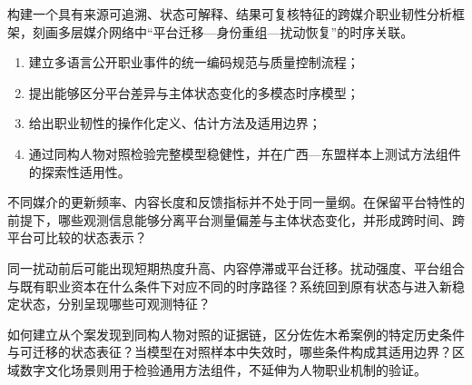 
构建一个具有来源可追溯、状态可解释、结果可复核特征的跨媒介职业韧性分析框架，刻画多层媒介网络中“平台迁移—身份重组—扰动恢复”的时序关联。

\begin{enumerate}[label=（\arabic*）,leftmargin=*,itemsep=0pt]
  \item 建立多语言公开职业事件的统一编码规范与质量控制流程；
  \item 提出能够区分平台差异与主体状态变化的多模态时序模型；
  \item 给出职业韧性的操作化定义、估计方法及适用边界；
  \item 通过同构人物对照检验完整模型稳健性，并在广西—东盟样本上测试方法组件的探索性适用性。
\end{enumerate}


不同媒介的更新频率、内容长度和反馈指标并不处于同一量纲。在保留平台特性的前提下，哪些观测信息能够分离平台测量偏差与主体状态变化，并形成跨时间、跨平台可比较的状态表示？

同一扰动前后可能出现短期热度升高、内容停滞或平台迁移。扰动强度、平台组合与既有职业资本在什么条件下对应不同的时序路径？系统回到原有状态与进入新稳定状态，分别呈现哪些可观测特征？

如何建立从个案发现到同构人物对照的证据链，区分佐佐木希案例的特定历史条件与可迁移的状态表征？当模型在对照样本中失效时，哪些条件构成其适用边界？区域数字文化场景则用于检验通用方法组件，不延伸为人物职业机制的验证。

